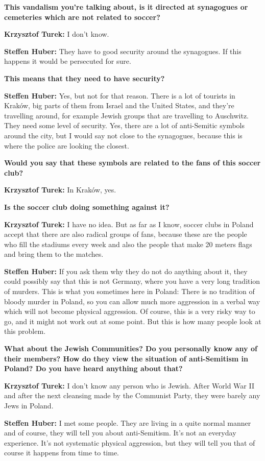 \textbf{This vandalism you're talking about, is it directed at synagogues or cemeteries which are not related to soccer?} 

\textbf{Krzysztof Turek:} I don't know.\par
\textbf{Steffen Huber:} They have to good security around the synagogues. If this happens it would be persecuted for sure. 

\textbf{This means that they need to have security?}  

\textbf{Steffen Huber:} Yes, but not for that reason. There is a lot of tourists in Kraków, big parts of them from Israel and the United States, and they're travelling around, for example Jewish groups that are travelling to Auschwitz. They need some level of security. Yes, there are a lot of anti-Semitic symbols around the city, but I would say not close to the synagogues, because this is where the police are looking the closest. 

\textbf{Would you say that these symbols are related to the fans of this soccer club?} 

\textbf{Krzysztof Turek:} In Kraków, yes. 

\textbf{Is the soccer club doing something against it?} 

\textbf{Krzysztof Turek:} I have no idea. But as far as I know, soccer clubs in Poland accept that there are also radical groups of fans, because these are the people who fill the stadiums every week and also the people that make 20 meters flags and bring them to the matches. \par
\textbf{Steffen Huber:} If you ask them why they do not do anything about it, they could possibly say that this is not Germany, where you have a very long tradition of murders. This is what you sometimes here in Poland: There is no tradition of bloody murder in Poland, so you can allow much more aggression in a verbal way which will not become physical aggression. Of course, this is a very risky way to go, and it might not work out at some point. But this is how many people look at this problem. 

\textbf{What about the Jewish Communities? Do you personally know any of their members? How do they view the situation of anti-Semitism in Poland? Do you have heard anything about that?}  

\textbf{Krzysztof Turek:} I don’t know any person who is Jewish. After World War II and after the next cleansing made by the Communist Party, they were barely any Jews in Poland. \par
\textbf{Steffen Huber:} I met some people. They are living in a quite normal manner and of course, they will tell you about anti-Semitism. It’s not an everyday experience. It's not systematic physical aggression, but they will tell you that of course it happens from time to time. 

